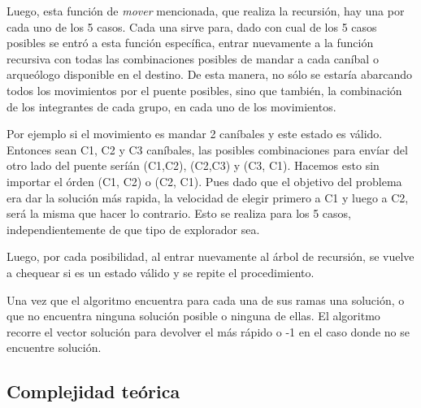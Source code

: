        Luego, esta función de \emph{mover} mencionada, que realiza la recursión, hay una por cada uno de los 5 casos. Cada una sirve para, dado con cual de los 5 casos posibles se entró a esta función específica, entrar nuevamente a la función recursiva con todas las combinaciones posibles de mandar a cada caníbal o arqueólogo disponible en el destino. De esta manera, no sólo se estaría abarcando todos los movimientos por el puente posibles, sino que también, la combinación de los integrantes de cada grupo, en cada uno de los movimientos.

       Por ejemplo si el movimiento es mandar 2 caníbales y este estado es válido. Entonces sean C1, C2 y C3 caníbales, las posibles combinaciones para envíar del otro lado del puente seríán (C1,C2), (C2,C3) y (C3, C1). Hacemos esto sin importar el órden (C1, C2) o (C2, C1). Pues dado que el objetivo del problema era dar la solución más rapida, la velocidad de elegir primero a C1 y luego a C2, será la misma que hacer lo contrario. Esto se realiza para los 5 casos, independientemente de que tipo de explorador sea.

       Luego, por cada posibilidad, al entrar nuevamente al árbol de recursión, se vuelve a chequear si es un estado válido y se repite el procedimiento. 

       Una vez que el algoritmo encuentra para cada una de sus ramas una solución, o que no encuentra ninguna solución posible o ninguna de ellas. El algoritmo recorre el vector solución para devolver el más rápido o -1 en el caso donde no se encuentre solución.


    \subsection{Complejidad teórica}

